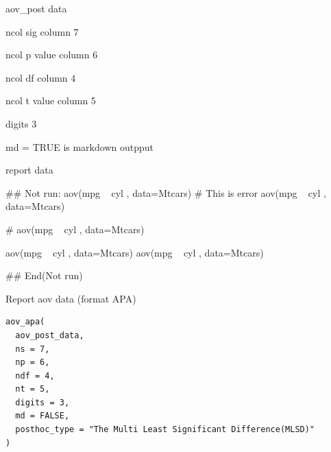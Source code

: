 \documentclass[a4paper]{book}
\begin{document}
%
\begin{Arguments}
\begin{ldescription}
\item[\code{aov\_post\_data}] aov\_post data

\item[\code{ns}] ncol sig column 7

\item[\code{np}] ncol p value column 6

\item[\code{ndf}] ncol df column 4

\item[\code{nt}] ncol t value column 5

\item[\code{digits}] digits 3

\item[\code{md}] md = TRUE is markdown outpput
\end{ldescription}
\end{Arguments}
%
\begin{Value}
report data
\end{Value}
%
\begin{Examples}
\begin{ExampleCode}
## Not run: 
aov(mpg ~ cyl , data=Mtcars)%
# This is error
aov(mpg ~ cyl , data=Mtcars)%

# aov(mpg ~ cyl , data=Mtcars)%

aov(mpg ~ cyl , data=Mtcars)%
aov(mpg ~ cyl , data=Mtcars)%


## End(Not run)

\end{ExampleCode}
\end{Examples}
%
\begin{Description}
Report aov data (format APA)
\end{Description}
%
\begin{Usage}
\begin{verbatim}
aov_apa(
  aov_post_data,
  ns = 7,
  np = 6,
  ndf = 4,
  nt = 5,
  digits = 3,
  md = FALSE,
  posthoc_type = "The Multi Least Significant Difference(MLSD)"
)
\end{verbatim}
\end{Usage}
%
\end{document}

